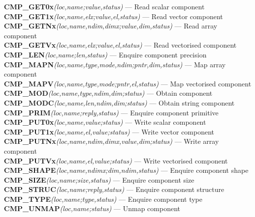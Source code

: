 \small
\noindent
{\bf CMP\_GET0x}{\em (loc,name;value,status)} --- Read scalar component\\
{\bf CMP\_GET1x}{\em (loc,name,elx;value,el,status)} --- Read vector component\\
{\bf CMP\_GETNx}{\em (loc,name,ndim,dimx;value,dim,status)} --- Read array component\\
{\bf CMP\_GETVx}{\em (loc,name,elx;value,el,status)} --- Read vectorised component\\
{\bf CMP\_LEN}{\em (loc,name;len,status)} --- Enquire component precision\\
{\bf CMP\_MAPN}{\em (loc,name,type,mode,ndim;pntr,dim,status)} --- Map array component\\
{\bf CMP\_MAPV}{\em (loc,name,type,mode;pntr,el,status)} --- Map vectorised component\\
{\bf CMP\_MOD}{\em (loc,name,type,ndim,dim;status)} --- Obtain component\\
{\bf CMP\_MODC}{\em (loc,name,len,ndim,dim;status)} --- Obtain string component\\
{\bf CMP\_PRIM}{\em (loc,name;reply,status)} --- Enquire component primitive\\
{\bf CMP\_PUT0x}{\em (loc,name,value;status)} --- Write scalar component\\
{\bf CMP\_PUT1x}{\em (loc,name,el,value;status)} --- Write vector component\\
{\bf CMP\_PUTNx}{\em (loc,name,ndim,dimx,value,dim;status)} --- Write array component\\
{\bf CMP\_PUTVx}{\em (loc,name,el,value;status)} --- Write vectorised component\\
{\bf CMP\_SHAPE}{\em (loc,name,ndimx;dim,ndim,status)} --- Enquire component shape\\
{\bf CMP\_SIZE}{\em (loc,name;size,status)} --- Enquire component size\\
{\bf CMP\_STRUC}{\em (loc,name;reply,status)} --- Enquire component structure\\
{\bf CMP\_TYPE}{\em (loc,name;type,status)} --- Enquire component type\\
{\bf CMP\_UNMAP}{\em (loc,name;status)} --- Unmap component\\

